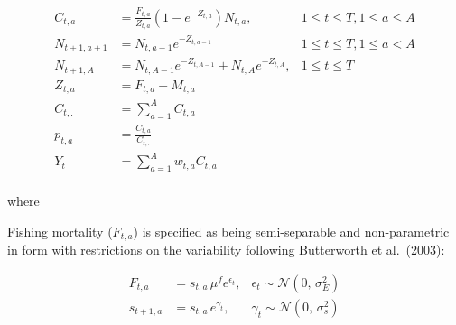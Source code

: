 \documentclass[11pt,
  english,
  a4paper,
]{article}
\begin{document}
\leavevmode\tagmcend\tagstructend\par


\begin{align}
    C_{t,a}     &= \frac{F_{t,a}}{Z_{t,a}} \left(1 - e^{-Z_{t,a}}\right) N_{t,a}, &1 \le t \le T, 1 \le a \le A \\
    N_{t+1,a+1} &= N_{t,a-1} e^{-Z_{t,a-1}}                                       &1 \le t \le T, 1 \le a < A   \\
    N_{t+1,A}   &= N_{t,A-1} e^{-Z_{t,A-1}} + N_{t,A} e^{-Z_{t,A}} ,              &1 \le t \le T                \\
    Z_{t,a}     &= F_{t,a} + M_{t,a}                                                                            \\
    C_{t,.}     &= \sum_{a=1}^A{C_{t,a}}                                                                        \\
    p_{t,a}     &= \frac{C_{t,a} } {C_{t,.} }                                                                   \\
    Y_{t}       &= \sum_{a=1}^A{w_{t,a}C_{t,a}}                                                                 \\
\end{align}

\leavevmode\tagmcend\tagstructend\par

where


Fishing mortality ({\(F_{t,a}\)\leavevmode\tagmcend\tagstructend}) is specified as being semi-separable and non-parametric in form with restrictions on the variability following Butterworth et al.~(2003):

\leavevmode\tagmcend\tagstructend\par


\begin{align}
    F_{t,a}     &= s_{t,a} \, \mu^f e^{\epsilon_t}, &\epsilon_t   \sim \mathcal{N}(0,\,\sigma_E^{2}) \\
    s_{t+1,a}   &= s_{t,a} \,       e^{\gamma_t},   &\gamma_t     \sim \mathcal{N}(0,\,\sigma_s^{2}) 
\end{align}

\leavevmode\tagmcend\tagstructend\par
\end{document}

